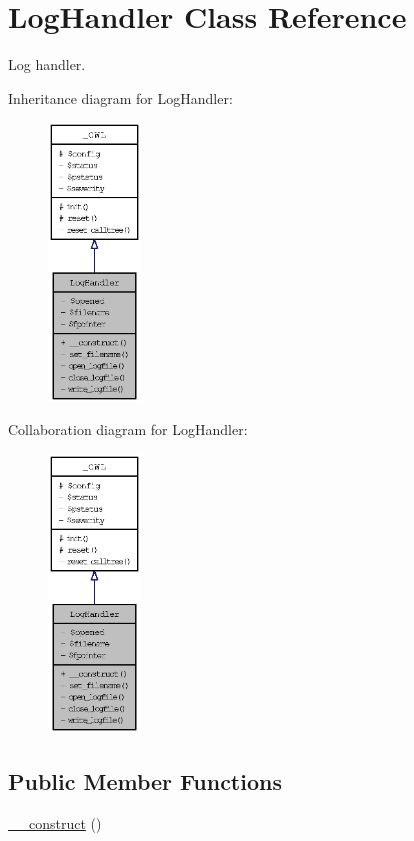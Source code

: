 \hypertarget{classLogHandler}{
\section{LogHandler Class Reference}
\label{classLogHandler}
}
Log handler.  


Inheritance diagram for LogHandler:\nopagebreak
\begin{figure}[H]
\begin{center}
\leavevmode
\includegraphics[width=70pt]{classLogHandler__inherit__graph}
\end{center}
\end{figure}
Collaboration diagram for LogHandler:\nopagebreak
\begin{figure}[H]
\begin{center}
\leavevmode
\includegraphics[width=70pt]{classLogHandler__coll__graph}
\end{center}
\end{figure}
\subsection*{Public Member Functions}
\begin{CompactItemize}
\item 
\hyperlink{classLogHandler_acca49c4394109f4ccc494048a0b2cab}{\_\-\_\-construct} ()
\end{CompactItemize}
